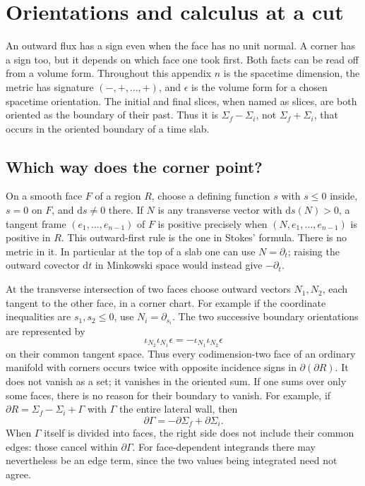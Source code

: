 \chapter{Orientations and calculus at a cut}\label{app:A}

An outward flux has a sign even when the face has no unit normal. A corner has a sign too, but it depends on which face one took first. Both facts can be read off from a volume form. Throughout this appendix $n$ is the spacetime dimension, the metric has signature $(-,+,\ldots,+)$, and $\epsilon$ is the volume form for a chosen spacetime orientation. The initial and final slices, when named as slices, are both oriented as the boundary of their past. Thus it is $\Sigma_f-\Sigma_i$, not $\Sigma_f+\Sigma_i$, that occurs in the oriented boundary of a time slab.

\section{Which way does the corner point?}

On a smooth face $F$ of a region $R$, choose a defining function $s$ with $s\leq 0$ inside, $s=0$ on $F$, and $\mathrm{d}s\ne0$ there. If $N$ is any transverse vector with $\mathrm{d}s(N)>0$, a tangent frame $(e_1,\ldots,e_{n-1})$ of $F$ is positive precisely when $(N,e_1,\ldots,e_{n-1})$ is positive in $R$. This outward-first rule is the one in Stokes' formula. There is no metric in it. In particular at the top of a slab one can use $N=\partial_t$; raising the outward covector $\mathrm{d}t$ in Minkowski space would instead give $-\partial_t$.

At the transverse intersection of two faces choose outward vectors $N_1,N_2$, each tangent to the other face, in a corner chart. For example if the coordinate inequalities are $s_1,s_2\leq0$, use $N_i=\partial_{s_i}$. The two successive boundary orientations are represented by
\[
 \iota_{N_2}\iota_{N_1}\epsilon
       =-\iota_{N_1}\iota_{N_2}\epsilon
\]
on their common tangent space. Thus every codimension-two face of an ordinary manifold with corners occurs twice with opposite incidence signs in $\partial(\partial R)$. It does not vanish as a set; it vanishes in the oriented sum. If one sums over only some faces, there is no reason for their boundary to vanish. For example, if $\partial R=\Sigma_f-\Sigma_i+\Gamma$ with $\Gamma$ the entire lateral wall, then
\begin{equation}
 \partial\Gamma=-\partial\Sigma_f+\partial\Sigma_i .
 \label{eq:app-a-wall-ends}
\end{equation}
When $\Gamma$ itself is divided into faces, the right side does not include their common edges: those cancel within $\partial\Gamma$. For face-dependent integrands there may nevertheless be an edge term, since the two values being integrated need not agree.

